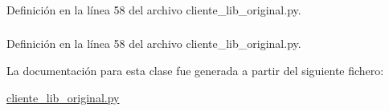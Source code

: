 \hypertarget{classcliente__lib__original_1_1cliente__lib_aa2933583abd7844c57b2ec553cbb46ee}{
\subsubsection[{x}]{}}
\label{classcliente__lib__original_1_1cliente__lib_aa2933583abd7844c57b2ec553cbb46ee}


Definición en la línea 58 del archivo cliente\_\-lib\_\-original.py.

\hypertarget{classcliente__lib__original_1_1cliente__lib_a6050f7c724f8ca063505e8b80a1cdecf}{
\subsubsection[{y}]{}}
\label{classcliente__lib__original_1_1cliente__lib_a6050f7c724f8ca063505e8b80a1cdecf}


Definición en la línea 58 del archivo cliente\_\-lib\_\-original.py.



La documentación para esta clase fue generada a partir del siguiente fichero:\begin{DoxyCompactItemize}
\item 
\hyperlink{cliente__lib__original_8py}{cliente\_\-lib\_\-original.py}\end{DoxyCompactItemize}
